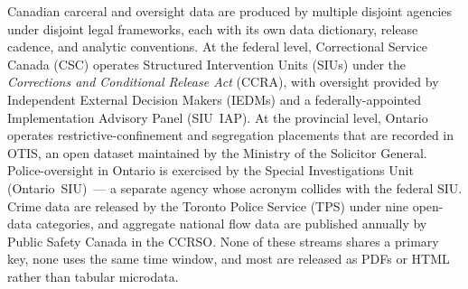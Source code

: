 \documentclass[11pt,a4paper]{article}
\theoremstyle{plain}
\theoremstyle{definition}
\theoremstyle{remark}
\begin{document}
Canadian carceral and oversight data are produced by multiple
disjoint agencies under disjoint legal frameworks, each with its
own data dictionary, release cadence, and analytic conventions.
At the federal level, Correctional Service Canada (CSC) operates
Structured Intervention Units (SIUs) under the
\emph{Corrections and Conditional Release Act} (CCRA), with
oversight provided by Independent External Decision Makers
(IEDMs) and a federally-appointed Implementation Advisory Panel
(SIU~IAP). At the provincial level, Ontario operates
restrictive-confinement and segregation placements that are
recorded in OTIS, an open dataset maintained by the Ministry of
the Solicitor General. Police-oversight in Ontario is exercised
by the Special Investigations Unit (Ontario~SIU)~--- a separate
agency whose acronym collides with the federal SIU. Crime data
are released by the Toronto Police Service (TPS) under nine
open-data categories, and aggregate national flow data are
published annually by Public Safety Canada in the CCRSO. None of
these streams shares a primary key, none uses the same time
window, and most are released as PDFs or HTML rather than tabular
microdata.
\end{document}
